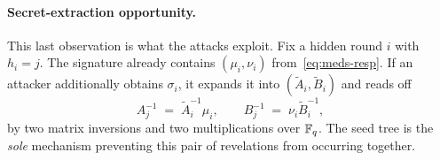 \paragraph{Secret-extraction opportunity.}
This last observation is what the attacks exploit. Fix a hidden round $i$ with
$h_i = j$. The signature already contains $(\mu_i,\nu_i)$
from~\eqref{eq:meds-resp}. If an attacker additionally obtains $\sigma_i$, it
expands it into $(\tilde{A}_i,\tilde{B}_i)$ and reads off
\begin{equation}
  \label{eq:meds-extract}
  A_j^{-1} \;=\; \tilde{A}_i^{-1} \mu_i,
  \qquad
  B_j^{-1} \;=\; \nu_i \tilde{B}_i^{-1},
\end{equation}
by two matrix inversions and two multiplications over $\mathbb{F}_q$. The seed tree is
the \emph{sole} mechanism preventing this pair of revelations from occurring
together.

